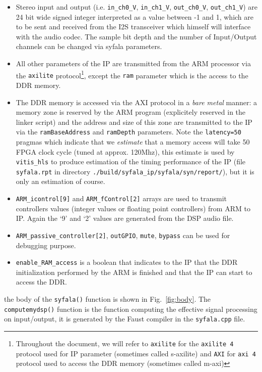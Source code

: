 \documentclass[11pt]{article}
\numberwithin{equation}{section}
\numberwithin{figure}{section}
\begin{document}
\begin{itemize}
\item Stereo input and output  (i.e. \verb#in_ch0_V#, \verb#in_ch1_V#, \verb#out_ch0_V#, \verb#out_ch1_V#) are 24 bit wide signed integer interpreted as a value between -1 and 1, which are to be sent and received from the I2S transceiver which himself will interface with the audio codec. The sample bit depth and the number of Input/Output channels can be changed via syfala parameters.
  \item All other parameters of the IP are transmitted from the ARM processor via the {\tt axilite} protocol\footnote{Throughout the document, we will refer to {\tt axilite} for the {\tt axilite 4} protocol used for IP parameter (sometimes called s-axilite) and {\tt AXI} for {\tt axi 4} protocol used to access the DDR memory (sometimes called m-axi)}, except the {\tt ram} parameter which is the access to the DDR memory. 
\item The DDR memory is accessed via the AXI protocol in a {\em bare metal} manner: a memory zone is reserved by the ARM program (explicitely reserved in the linker script) and the address and size of this zone are transmitted to the IP via the {\tt ramBaseAddress} and {\tt ramDepth} parameters. Note the {\tt latency=50} pragmas which indicate that we {\em estimate} that a memory access will take 50 FPGA clock cycle (tuned at approx. 120Mhz), this estimate is used by {\tt vitis\_hls} to produce estimation of the timing performance of the IP (file {\tt syfala.rpt} in directory {\tt ./build/syfala\_ip/syfala/syn/report/}), but it is only an estimation of course.
\item {\tt ARM\_icontrol[9]} and {\tt ARM\_fControl[2]} arrays are used to transmit controllers values (integer values or floating point controllers) from ARM to IP. Again the `9' and `2' values are generated from the DSP audio file.
\item  {\tt ARM\_passive\_controller[2]}, {\tt outGPIO}, {\tt mute}, {\tt bypass}  can be used for debugging purpose.
\item {\tt enable\_RAM\_access} is a boolean that indicates to the IP that the DDR initialization performed by the ARM is finished and that the IP can start to access the DDR.
\end{itemize}

the body of the {\tt syfala()} function is shown in Fig.~\ref{fig:body}. The {\tt computemydsp()} function is the function computing the effective signal processing on input/output, it is generated by the Faust compiler in the {\tt syfala.cpp} file.
\end{document}
